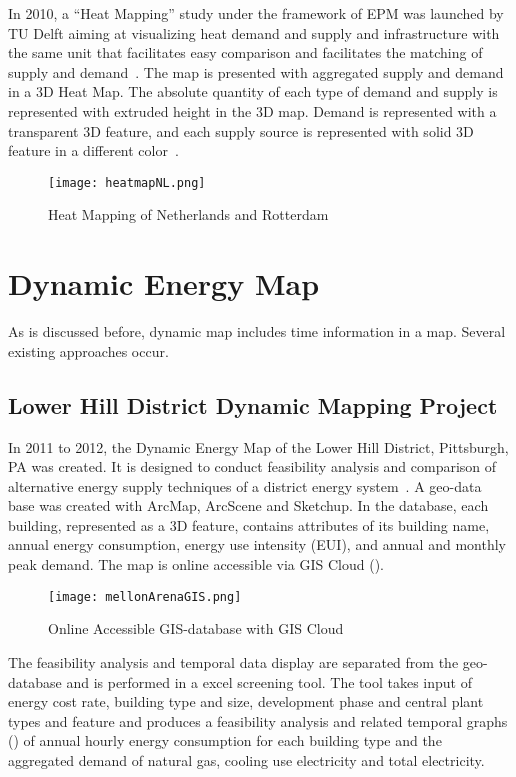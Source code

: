 In 2010, a ``Heat Mapping'' study under the framework of EPM was
launched by TU Delft aiming at visualizing heat demand and supply and
infrastructure with the same unit that facilitates easy comparison and
facilitates the matching of supply and
demand~\cite{Dobbelsteen2013}. The map is presented with aggregated
supply and demand in a 3D Heat Map. The absolute quantity of each type
of demand and supply is represented with extruded height in the 3D
map. Demand is represented with a transparent 3D feature, and each
supply source is represented with solid 3D feature in a different
color~\cite{Dobbelsteen2013}.

\begin{figure}[htbp]
  \centering
  \texttt{[image: heatmapNL.png]}
  \caption[Rotterdam Heat Map]{Heat Mapping of Netherlands and
    Rotterdam~\cite{Dobbelsteen2013}}
  \label{fig:heatmapNL}
\end{figure}

\section{Dynamic Energy Map}\label{dynamicMap}
As is discussed before, dynamic map includes time information in a
map. Several existing approaches occur.

\subsection{Lower Hill District Dynamic Mapping Project}
In 2011 to 2012, the Dynamic Energy Map of the Lower Hill District,
Pittsburgh, PA was created. It is designed to conduct feasibility
analysis and comparison of alternative energy supply techniques of a
district energy system~\cite{baird2014, Ramesh2013}. A geo-data base
was created with ArcMap, ArcScene and Sketchup. In the database, each
building, represented as a 3D feature, contains attributes of its
building name, annual energy consumption, energy use intensity (EUI),
and annual and monthly peak demand. The map is online accessible via
GIS Cloud ().

\begin{figure}[h!]
  \centering
  \texttt{[image: mellonArenaGIS.png]}
  \caption[Lower Hill District 3D GIS Map]{Online Accessible GIS-database with GIS
    Cloud~\cite{baird2014, Ramesh2013}}
  \label{fig:mellonArenaGIS}
\end{figure}

The feasibility analysis and temporal data display are separated from
the geo-database and is performed in a excel screening tool. The tool
takes input of energy cost rate, building type and size, development
phase and central plant types and feature and produces a feasibility
analysis and related temporal graphs () of annual
hourly energy consumption for each building type and the aggregated
demand of natural gas, cooling use electricity and total electricity.

